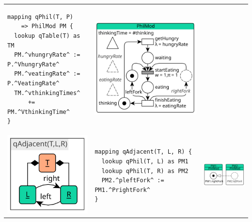 \begin{table}
\begin{tabular}{@{}>{\centering\arraybackslash}m{}@{}m{}@{}>{\centering\arraybackslash}m{}@{}}
\begin{lstlisting}
mapping qPhil(T, P)
    => PhilMod PM {
  lookup qTable(T) as TM
  PM.^vhungryRate^ := P.^VhungryRate^
  PM.^veatingRate^ := P.^VeatingRate^
  TM.^vthinkingTimes^
      += PM.^VthinkingTime^
}
\end{lstlisting} &\includegraphics[scale=0.8]{figures/phil_module}\\[-2ex]
  \includegraphics[scale=0.8]{figures/q_adjacent_pattern}& \begin{lstlisting}
mapping qAdjacent(T, L, R) {
  lookup qPhil(T, L) as PM1
  lookup qPhil(T, R) as PM2
  PM2.^pleftFork^ := PM1.^PrightFork^
}
\end{lstlisting} &\includegraphics[scale=0.8]{figures/adjacent_phils_module}\\

\end{tabular}
\end{table}
